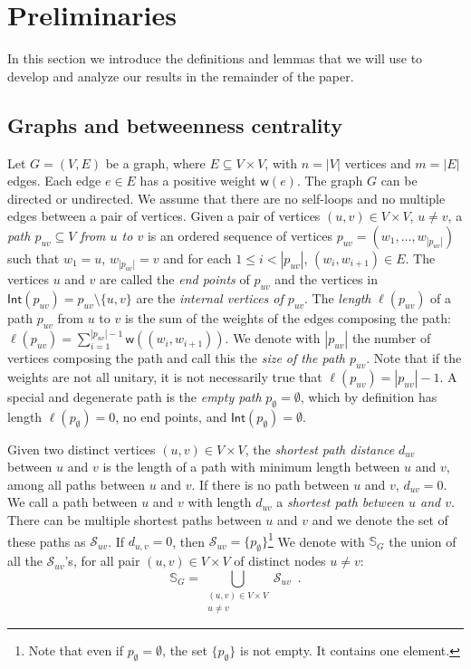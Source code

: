 \section{Preliminaries}\label{sec:prelims}
In this section we introduce the definitions and lemmas that we will use to
develop and analyze our results in the remainder of the paper.

\subsection{Graphs and betweenness centrality}\label{sec:graphprelims}
Let $G=(V,E)$ be a graph, where $E\subseteq V\times V$, with $n=|V|$ vertices
and $m=|E|$ edges. Each edge
$e\in E$ has a positive weight $\mathsf{w}(e)$. The graph
$G$ can be directed or undirected. We assume
that there are no self-loops and no multiple edges between a pair of vertices.
Given a pair of vertices $(u,v)\in V\times V$,
$u\neq v$, a \emph{path $p_{uv}\subseteq V$ from $u$ to $v$} is an ordered sequence of
vertices $p_{uv}=(w_1,\dotsc,w_{|p_{uv}|})$ such that $w_1=u$, $w_{|p_{uv}|}=v$ and
for each $1\le i < |p_{uv}|$, $(w_i,w_{i+1})\in E$. The vertices $u$ and $v$ are
called the \emph{end points} of $p_{uv}$ and the vertices in
$\mathsf{Int}(p_{uv})=p_{uv}\setminus\{u,v\}$ are the \emph{internal vertices of
$p_{uv}$}. The \emph{length}
$\ell(p_{uv})$ of a path $p_{uv}$ from $u$ to $v$ is the sum of the weights of
the edges composing the path:
$\ell(p_{uv})=\sum_{i=1}^{|p_{uv}|-1}\mathsf{w}((w_i,w_{i+1}))$. We denote with
$|p_{uv}|$ the number of vertices composing the path and call this the
\emph{size of the path $p_{uv}$}. Note that if the weights are not all unitary,
it is not necessarily true that $\ell(p_{uv})=|p_{uv}|-1$. A special and
degenerate path is the \emph{empty path} $p_{\emptyset}=\emptyset$, which by
definition has length $\ell(p_\emptyset)=0$, no end points, and
$\mathsf{Int}(p_\emptyset)=\emptyset$.

Given two distinct vertices $(u,v)\in V\times V$, the \emph{shortest path distance}
$d_{uv}$ between $u$ and $v$ is the length of a path with minimum length
between $u$ and $v$, among all paths between $u$ and $v$. If there is no path
between $u$ and $v$, $d_{uv}=0$. We call a path between $u$ and $v$ with
length $d_{uv}$ a \emph{shortest path between $u$ and $v$}. There can be
multiple shortest paths between $u$ and $v$ and we denote the set of these paths
as $\mathcal{S}_{uv}$. If $d_{u,v}=0$, then
$\mathcal{S}_{uv}=\{p_\emptyset\}$\footnote{Note that even if
$p_\emptyset=\emptyset$, the set $\{p_\emptyset\}$ is not empty. It contains
one element.}
We denote with $\mathbb{S}_G$ the union of all the $\mathcal{S}_{uv}$'s, for all
pair $(u,v)\in V\times V$ of distinct nodes $u\neq v$: 
\[ \mathbb{S}_G=\bigcup_{\substack{(u,v)\in V\times V \\ u\neq v}}\mathcal{S}_{uv}\enspace.\]

